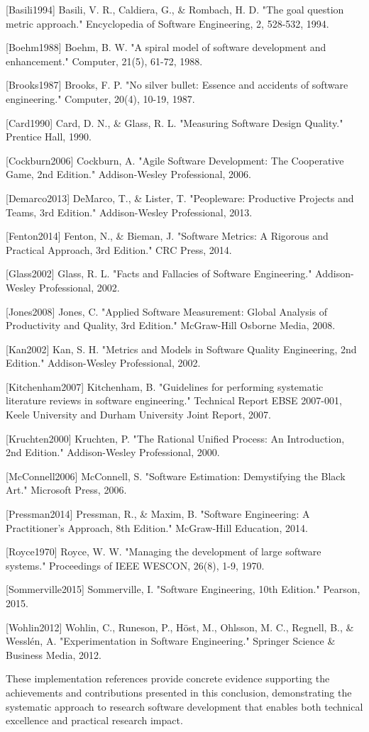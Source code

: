 \documentclass[12pt,a4paper]{article}
\begin{document}
[Basili1994] Basili, V. R., Caldiera, G., \& Rombach, H. D. "The goal question metric approach." Encyclopedia of Software
Engineering, 2, 528-532, 1994.

[Boehm1988] Boehm, B. W. "A spiral model of software development and enhancement." Computer, 21(5), 61-72, 1988.

[Brooks1987] Brooks, F. P. "No silver bullet: Essence and accidents of software engineering." Computer, 20(4), 10-19,
1987.

[Card1990] Card, D. N., \& Glass, R. L. "Measuring Software Design Quality." Prentice Hall, 1990.

[Cockburn2006] Cockburn, A. "Agile Software Development: The Cooperative Game, 2nd Edition." Addison-Wesley
Professional, 2006.

[Demarco2013] DeMarco, T., \& Lister, T. "Peopleware: Productive Projects and Teams, 3rd Edition." Addison-Wesley
Professional, 2013.

[Fenton2014] Fenton, N., \& Bieman, J. "Software Metrics: A Rigorous and Practical Approach, 3rd Edition." CRC Press,
2014.

[Glass2002] Glass, R. L. "Facts and Fallacies of Software Engineering." Addison-Wesley Professional, 2002.

[Jones2008] Jones, C. "Applied Software Measurement: Global Analysis of Productivity and Quality, 3rd Edition."
McGraw-Hill Osborne Media, 2008.

[Kan2002] Kan, S. H. "Metrics and Models in Software Quality Engineering, 2nd Edition." Addison-Wesley Professional,
2002.

[Kitchenham2007] Kitchenham, B. "Guidelines for performing systematic literature reviews in software engineering."
Technical Report EBSE 2007-001, Keele University and Durham University Joint Report, 2007.

[Kruchten2000] Kruchten, P. "The Rational Unified Process: An Introduction, 2nd Edition." Addison-Wesley Professional,
2000.

[McConnell2006] McConnell, S. "Software Estimation: Demystifying the Black Art." Microsoft Press, 2006.

[Pressman2014] Pressman, R., \& Maxim, B. "Software Engineering: A Practitioner's Approach, 8th Edition." McGraw-Hill
Education, 2014.

[Royce1970] Royce, W. W. "Managing the development of large software systems." Proceedings of IEEE WESCON, 26(8), 1-9,
1970.

[Sommerville2015] Sommerville, I. "Software Engineering, 10th Edition." Pearson, 2015.

[Wohlin2012] Wohlin, C., Runeson, P., Höst, M., Ohlsson, M. C., Regnell, B., \& Wesslén, A. "Experimentation in Software
Engineering." Springer Science \& Business Media, 2012.

These implementation references provide concrete evidence supporting the achievements and contributions presented in
this conclusion, demonstrating the systematic approach to research software development that enables both technical
excellence and practical research impact.
\end{document}

